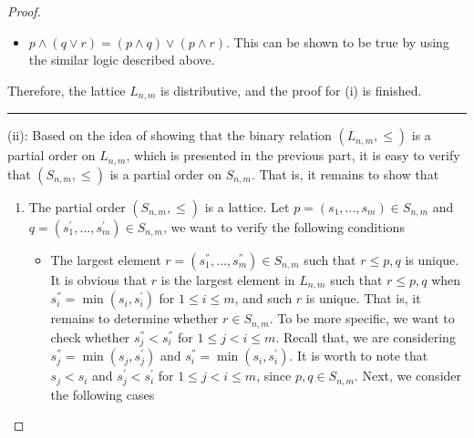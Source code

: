 \begin{proof}
\begin{enumerate}[label=(\alph*)]
\begin{itemize}
          Otherwise, when $s_{i} \geq \min(s_{i}^{'}, s_{i}^{''})$, then the LHS of the equation $(2.1)$ is equal to $s_{i}$, and $s_{i}$ is larger than either $s_{i}$ or $s_{i}^{'}$, or $s_{i}$ is larger than both. If $s_{i}$ is larger than either $s_{i}^{'}$ or $s_{i}^{''}$, then the RHS of the equation $(2.1)$ is equal to either $\min(s_{i},s_{i}^{''})$ or $\min(s_{i}^{'},s_{i})$ respectively, and thus the RHS of the equation is equal to either $\min(s_{i},s_{i}^{''})= s_{i}$ or $\min(s_{i}^{'}, s_{i}) = s_{i}$; hence, the LHS and RHS of the equation $(2.1)$ are equal to each other in this case. If $s_{i}$ is larger than both $s_{i}^{'}$ and $s_{i}^{''}$, then the RHS of the equation is equal to $\min(s_{i}, s_{i}) = s_{i}$, and thus the LHS and RHS of the equation $(2.1)$ are equal to each other in this case. Therefore, the equation $(2.1)$ always holds.
        \item $p \wedge (q \vee r) = (p \wedge q) \vee (p \wedge r)$. This can be shown to be true by using the similar logic described above.
      \end{itemize}
      Therefore, the lattice $L_{n,m}$ is distributive, and the proof for (i) is finished.
  \end{enumerate}
  \vspace{5pt}
  \hrule
  (ii): Based on the idea of showing that the binary relation $(L_{n,m}, \leq)$ is a partial order on $L_{n,m}$, which is presented in the previous part, it is easy to verify that $(S_{n,m}, \leq)$ is a partial order on $S_{n,m}$. That is, it remains to show that 
  \begin{enumerate}[label=(\alph*)]
    \item The partial order $(S_{n,m}, \leq)$ is a lattice. Let $p = (s_{1}, \ldots, s_{m}) \in S_{n,m}$ and $q = (s_{1}^{'}, \ldots, s_{m}^{'}) \in S_{n,m}$, we want to verify the following conditions
      \begin{itemize}
        \item The largest element $r = (s_{1}^{''}, \ldots, s_{m}^{''}) \in S_{n,m}$ such that $r \leq p,q$ is unique. It is obvious that $r$ is the largest element in $L_{n,m}$ such that $r \leq p,q$ when $s_{i}^{''} = \min(s_{i}, s_{i}^{'})$ for $1 \leq i \leq m$, and such $r$ is unique. That is, it remains to determine whether $r \in S_{n,m}$. To be more specific, we want to check whether $s_{j}^{''} < s_{i}^{''}$ for $1 \leq j < i \leq m$. Recall that, we are considering $s_{j}^{''} = \min(s_{j},s_{j}^{'})$ and $s_{i}^{''} = \min(s_{i},s_{i}^{'})$. It is worth to note that $s_{j} < s_{i}$ and $s_{j}^{'} < s_{i}^{'}$ for $1 \leq j < i \leq m$, since $p,q \in S_{n,m}$. Next, we consider the following cases

\end{itemize}
\end{enumerate}
\end{proof}
